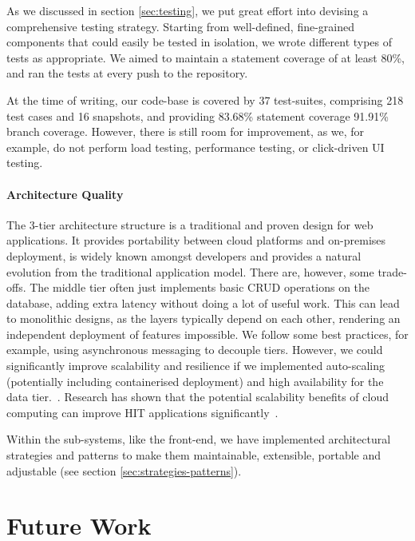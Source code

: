 \documentclass[sigconf]{acmart}
\begin{document}
As we discussed in section \ref{sec:testing}, we put great effort into devising a comprehensive testing strategy. Starting from well-defined, fine-grained components that could easily be tested in isolation, we wrote different types of tests as appropriate. We aimed to maintain a statement coverage of at least 80\%, and ran the tests at every push to the repository.

At the time of writing, our code-base is covered by 37 test-suites, comprising 218 test cases and 16 snapshots, and providing 83.68\% statement coverage 91.91\% branch coverage. However, there is still room for improvement, as we, for example, do not perform load testing, performance testing, or click-driven UI testing.


\paragraph{Architecture Quality}

The 3-tier architecture structure is a traditional and proven design for web applications. It provides portability between cloud platforms and on-premises deployment, is widely known amongst developers and provides a natural evolution from the traditional application model. There are, however, some trade-offs. The middle tier often just implements basic CRUD operations on the database, adding extra latency without doing a lot of useful work. This can lead to monolithic designs, as the layers typically depend on each other, rendering an independent deployment of features impossible. We follow some best practices, for example, using asynchronous messaging to decouple tiers. However, we could significantly improve scalability and resilience if we implemented auto-scaling (potentially including containerised deployment) and high availability for the data tier.~\cite{ms-ntier}. Research has shown that the potential scalability benefits of cloud computing can improve HIT applications significantly~\cite{cloud-computing}.

Within the sub-systems, like the front-end, we have implemented architectural strategies and patterns to make them maintainable, extensible, portable and adjustable (see section \ref{sec:strategies-patterns}).


\section{Future Work}
\label{sec:future-work}
\end{document}
